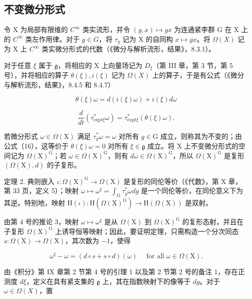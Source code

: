 \subsection{不变微分形式}

令 X 为局部有限维的 \(C^{\infty}\) 类实流形，并令 \((g, x) \mapsto gx\) 为连通紧李群 G 在 X 上的 \(C^{\infty}\) 类左作用律。对于 \(g \in G\)，将 \(\tau_{g}\) 记为 X 的自同构 \(x \mapsto gx\)。将 \(\Omega(X)\) 记为 X 上 \(C^{\infty}\) 类实微分形式的代数（《微分与解析流形，结果》，8.3.1）。

对于任意 \(\xi\) 属于 \(\mathfrak{g}\)，将相应的 X 上向量场记为 \(D_{\xi}\)（第 III 章，第 3 节，第 5 号），并将相应的算子 \(\theta(\xi), i(\xi)\) 记为 \(\Omega(X)\) 上的算子，于是有公式（《微分与解析流形，结果》，8.4.5 和 8.4.7）

\[
\theta (\xi) \omega = d (i (\xi) \omega) + i (\xi) d \omega\tag{15}
\]

\[
\frac {d}{d t} (\tau_ {\mathrm{exp} t \xi} ^ {*} \omega) = \tau_ {\mathrm{exp} t \xi} ^ {*} (\theta (\xi) \omega).\tag{16}
\]

若微分形式 \(\omega \in \Omega(\mathrm{X})\) 满足 \(\tau_g^*\omega = \omega\) 对所有 \(g \in \mathrm{G}\) 成立，则称其为不变的；由公式（16），这等价于 \(\theta(\xi)\omega = 0\) 对所有 \(\xi \in \mathfrak{g}\) 成立。将 X 上不变微分形式的空间记为 \(\Omega(\mathrm{X})^{\mathrm{G}}\)；若 \(\omega \in \Omega(\mathrm{X})^{\mathrm{G}}\)，则有 \(d\omega \in \Omega(\mathrm{X})^{\mathrm{G}}\)，所以 \(\Omega(\mathrm{X})^{\mathrm{G}}\) 是复形 \((\Omega(\mathrm{X}), d)\) 的子复形。

定理 2. 典则嵌入 \(\iota : \Omega(\mathrm{X})^{\mathrm{G}} \to \Omega(\mathrm{X})\) 是复形的同伦等价（《代数》，第 X 章，第 33 页，定义 5）；映射 \(\omega \mapsto \omega^{\sharp} = \int_{\mathrm{G}} \tau_g^* \omega dg\) 是一个同伦等价，在同伦意义下为其逆。特别地，映射 \(\mathrm{H}(\iota) : \mathrm{H}(\Omega(\mathrm{X})^{\mathrm{G}}) \to \mathrm{H}(\Omega(\mathrm{X}))\) 是双射。

由第 4 号的推论 3，映射 \(\omega \mapsto \omega^{\sharp}\) 是从 \(\Omega(\mathrm{X})\) 到 \(\Omega(\mathrm{X})^{\mathrm{G}}\) 的复形态射，并且在子复形 \(\Omega(\mathrm{X})^{\mathrm{G}}\) 上诱导恒等映射；因此，要证明定理，只需构造一个分次同态 \(s: \Omega(\mathrm{X}) \to \Omega(\mathrm{X})\)，其次数为 \(-1\)，使得

\[
\omega^ {\sharp} - \omega = (d \circ s + s \circ d) (\omega) \quad \text { for   all } \omega \in \Omega (\mathrm{X}).\tag{17}
\]

由《积分》第 IX 章第 2 节第 4 号的引理 1 以及第 2 节第 2 号的备注 1，存在正测度 \(d\xi\)，定义在具有紧支集的 \(\mathfrak{g}\) 上，其在指数映射下的像等于 \(dg\)。对于 \(\omega \in \Omega(X)\)，置

